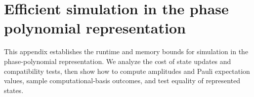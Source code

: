 \section{Efficient simulation in the phase polynomial representation}
\label{appendix:efficient-simulation}

This appendix establishes the runtime and memory bounds for simulation in the phase-polynomial representation.
We analyze the cost of state updates and compatibility tests, then show how to compute amplitudes and Pauli expectation values, sample computational-basis outcomes, and test equality of represented states.

\begin{efficientsimulationrestatement}
\efficientSimulationStatement{}
\end{efficientsimulationrestatement}

